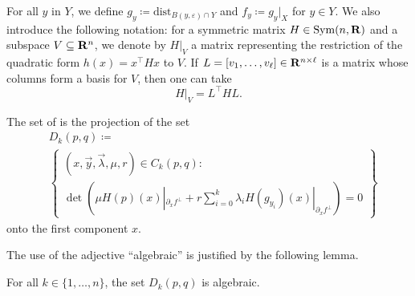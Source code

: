 For all $y$ in $Y$, we define $g_y \coloneq \text{dist}_{B(y, \varepsilon) \cap Y}$ and $f_y \coloneq g_y |_X$ for $y \in Y$.
We also introduce the following notation: for a symmetric matrix $H\in \mathrm{Sym}(n, \mathbf{R})$ and a subspace $V\subseteq \mathbf{R}^n$, we denote by 
$H|_V$ a matrix representing the restriction of the quadratic form $h(x)=x^\top Hx$ to $V$. If $L=[v_1, \ldots, v_\ell]\in \mathbf{R}^{n\times \ell}$ is a matrix whose columns form a basis for $V$, then one can take
$$H|_{V}=L^\top HL.$$

\begin{definition}
  The set of  is the projection of the set
  \begin{equation}
  \label{D!E:alg-degenerate}
    \begin{aligned}
      & D_k(p, q) \coloneq \\
      & \left\{
      \begin{array}{l}
        (x, \vec{y}, \vec{\lambda}, \mu, r) \in C_k(p, q) : \\
        \det \left(\mu H(p)(x)|_{\partial_x f^\bot} + r \sum_{i = 0}^k \lambda_i H(g_{y_i})(x)|_{\partial_x f^\bot} \right) = 0
      \end{array}
      \right\}
    \end{aligned}
  \end{equation}
  onto the first component $x$.
\end{definition}

The use of the adjective ``algebraic'' is justified by the following lemma.

\begin{lemma}
\label{D!L:alg-deg-is-alg}
  For all $k \in \{1, \ldots, n\}$, the set $D_k(p, q)$ is algebraic.
\end{lemma}

